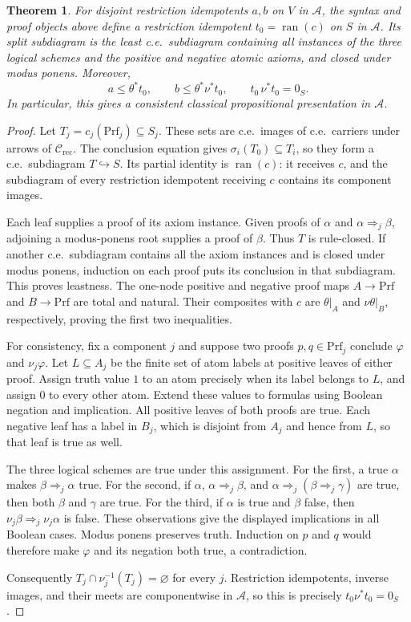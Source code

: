 \documentclass[11pt]{article}
\newtheorem{theorem}{Theorem}[section]
\newcommand{\ran}{\operatorname{ran}}
\begin{document}
\begin{theorem}\label{thm:fork-proof-presentation}
For disjoint restriction idempotents $a,b$ on $V$ in $\mathcal A$, the syntax and
proof objects above define a restriction idempotent $t_0=\ran(c)$ on $S$ in
$\mathcal A$. Its split subdiagram is the least c.e.\ subdiagram
containing all instances of the three logical schemes and the
positive and negative atomic axioms, and closed under modus ponens.
Moreover,
\[
 a\le\theta^*t_0,\qquad
 b\le\theta^*\nu^*t_0,\qquad
 t_0\,\nu^*t_0=0_S.
\]
In particular, this gives a consistent classical propositional
presentation in $\mathcal A$.
\end{theorem}
\begin{proof}
Let $T_j=c_j(\mathrm{Prf}_j)\subseteq S_j$.
These sets are c.e.\ images of c.e.\ carriers under
arrows of $\mathcal C_{\mathrm{rec}}$. The conclusion equation gives
$\sigma_i(T_0)\subseteq T_i$, so they form a c.e.\
subdiagram $T\hookrightarrow S$. Its partial identity is
$\ran(c)$: it receives $c$, and the subdiagram of every restriction
idempotent receiving $c$ contains its component images.

Each leaf supplies a proof of its axiom instance. Given proofs
of $\alpha$ and $\alpha\Rightarrow_j\beta$, adjoining a
modus-ponens root supplies a proof of $\beta$. Thus $T$ is
rule-closed. If another c.e.\ subdiagram contains all
the axiom instances and is closed under modus ponens, induction
on each proof puts its conclusion in that subdiagram. This
proves leastness. The one-node positive and negative proof maps
$A\to\mathrm{Prf}$ and $B\to\mathrm{Prf}$ are total and natural.
Their composites with $c$ are $\theta|_A$ and
$\nu\theta|_B$, respectively, proving the first two inequalities.

For consistency, fix a component $j$ and suppose two proofs
$p,q\in\mathrm{Prf}_j$ conclude $\varphi$ and $\nu_j\varphi$.
Let $L\subseteq A_j$ be the finite set of atom labels at
positive leaves of either proof. Assign truth value $1$ to an
atom precisely when its label belongs to $L$, and assign $0$
to every other atom. Extend these values to formulas using
Boolean negation and implication.
All positive leaves of both proofs are true. Each negative
leaf has a label in $B_j$, which is disjoint from $A_j$ and
hence from $L$, so that leaf is true as well.

The three logical schemes are true under this assignment.
For the first, a true $\alpha$ makes
$\beta\Rightarrow_j\alpha$ true. For the second, if
$\alpha$, $\alpha\Rightarrow_j\beta$, and
$\alpha\Rightarrow_j(\beta\Rightarrow_j\gamma)$ are true,
then both $\beta$ and $\gamma$ are true. For the third, if
$\alpha$ is true and $\beta$ false, then
$\nu_j\beta\Rightarrow_j\nu_j\alpha$ is false.
These observations give the displayed implications in all
Boolean cases. Modus ponens preserves truth. Induction on
$p$ and $q$ would therefore make $\varphi$ and its negation
both true, a contradiction.

Consequently $T_j\cap\nu_j^{-1}(T_j)=\varnothing$ for every
$j$. Restriction idempotents, inverse images, and their meets are componentwise
in $\mathcal A$, so this is precisely $t_0\nu^*t_0=0_S$.
\end{proof}
\end{document}

